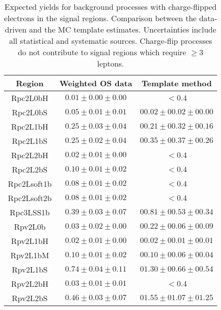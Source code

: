 \begin{table}[!htb]
\caption{Expected yields for background processes with charge-flipped electrons
in the signal regions. Comparison between the data-driven and the MC template
estimates.
Uncertainties include all statistical and systematic sources. 
Charge-flip processes do not contribute to signal regions which require $\ge 3$ leptons. 
}
\label{tab:chargeflip_sr_yields}
\centering
\begin{tabular}{|c||c|c|}\hline
 Region      &   Weighted OS data          &     Template method \\\hline
    Rpc2L0bH & $ 0.01 \pm  0.00 \pm  0.00$ & $<0.4$ \\
    Rpc2L0bS & $ 0.05 \pm  0.01 \pm  0.01$ & $ 00.02 \pm 00.02 \pm 00.00 $ \\
    Rpc2L1bH & $ 0.25 \pm  0.03 \pm  0.04$ & $ 00.21 \pm 00.32 \pm 00.16 $ \\
    Rpc2L1bS & $ 0.25 \pm  0.02 \pm  0.04$ & $ 00.35 \pm 00.37 \pm 00.26 $ \\
    Rpc2L2bH & $ 0.02 \pm  0.01 \pm  0.00$ & $<0.4$ \\
    Rpc2L2bS & $ 0.10 \pm  0.01 \pm  0.02$ & $<0.4$ \\
 Rpc2Lsoft1b & $ 0.08 \pm  0.01 \pm  0.02$ & $<0.4$ \\
 Rpc2Lsoft2b & $ 0.08 \pm  0.01 \pm  0.02$ & $<0.4$ \\
   Rpc3LSS1b & $ 0.39 \pm  0.03 \pm  0.07$ & $ 00.81 \pm 00.53 \pm 00.34 $ \\
     Rpv2L0b & $ 0.03 \pm  0.02 \pm  0.00$ & $ 00.22 \pm 00.06 \pm 00.09 $ \\
    Rpv2L1bH & $ 0.02 \pm  0.01 \pm  0.00$ & $ 00.02 \pm 00.01 \pm 00.01 $ \\
    Rpv2L1bM & $ 0.10 \pm  0.01 \pm  0.02$ & $ 00.10 \pm 00.06 \pm 00.04 $ \\
    Rpv2L1bS & $ 0.74 \pm  0.04 \pm  0.11$ & $ 01.30 \pm 00.66 \pm 00.54 $ \\
    Rpv2L2bH & $ 0.03 \pm  0.01 \pm  0.01$ & $<0.4$ \\
    Rpv2L2bS & $ 0.46 \pm  0.03 \pm  0.07$ & $ 01.55 \pm 01.07 \pm 01.25 $ \\
\hline
\hline
\end{tabular}
\end{table}
